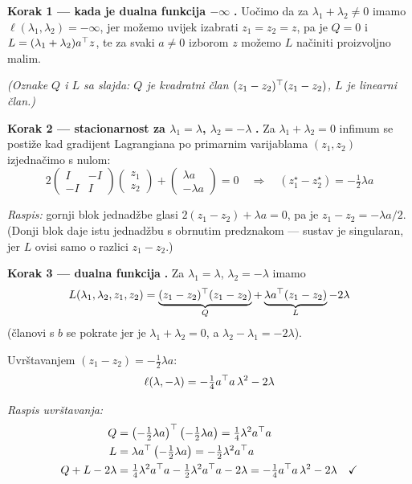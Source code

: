 \textbf{Korak 1 --- kada je dualna funkcija $-\infty$} \textbf{.}
Uočimo da za $\lambda_1 + \lambda_2 \ne 0$ imamo
$\ell(\lambda_1,\lambda_2) = -\infty$, jer možemo uvijek izabrati
$z_1 = z_2 = z$, pa je $Q = 0$ i $L = (\lambda_1+\lambda_2)a^{\top} z$, te za svaki
$a \ne 0$ izborom $z$ možemo $L$ načiniti proizvoljno malim.

\emph{(Oznake $Q$ i $L$ sa slajda: $Q$ je kvadratni član
$(z_1-z_2)^{\top}(z_1-z_2)$, $L$ je linearni član.)}

\textbf{Korak 2 --- stacionarnost za $\lambda_1 = \lambda$,
$\lambda_2 = -\lambda$} \textbf{.} Za $\lambda_1 + \lambda_2 = 0$
infimum se postiže kad gradijent Lagrangiana po primarnim varijablama
$(z_1,z_2)$ izjednačimo s nulom:
\[
2\begin{pmatrix} I & -I \\ -I & I\end{pmatrix}
\begin{pmatrix}z_1\\z_2\end{pmatrix}
+ \begin{pmatrix}\lambda a \\ -\lambda a\end{pmatrix} = 0
\quad\Longrightarrow\quad
(z_1^\star - z_2^\star) = -\tfrac12\lambda a
\]

\emph{Raspis:} gornji blok jednadžbe glasi $2(z_1 - z_2) + \lambda a = 0$, pa je
$z_1 - z_2 = -\lambda a/2$. (Donji blok daje istu jednadžbu s obrnutim
predznakom --- sustav je singularan, jer $L$ ovisi samo o razlici $z_1 - z_2$.)
\checkmark

\textbf{Korak 3 --- dualna funkcija} \textbf{.} Za
$\lambda_1 = \lambda$, $\lambda_2 = -\lambda$ imamo
\[
L(\lambda_1,\lambda_2,z_1,z_2)
= \underbrace{(z_1-z_2)^{\top}(z_1-z_2)}_{Q}
+ \underbrace{\lambda a^{\top}(z_1-z_2)}_{L} - 2\lambda
\]
(članovi s $b$ se pokrate jer je $\lambda_1 + \lambda_2 = 0$, a
$\lambda_2 - \lambda_1 = -2\lambda$).

Uvrštavanjem $(z_1 - z_2) = -\tfrac12\lambda a$:
\[
\ell(\lambda,-\lambda) = -\tfrac14 a^{\top} a\,\lambda^2 - 2\lambda
\]

\emph{Raspis uvrštavanja:}
\begin{align}
Q &= \left(-\tfrac12\lambda a\right)^{\top}\left(-\tfrac12\lambda a\right)
   = \tfrac14\lambda^2 a^{\top} a \\
L &= \lambda a^{\top}\left(-\tfrac12\lambda a\right) = -\tfrac12\lambda^2 a^{\top} a \\
Q + L - 2\lambda
  &= \tfrac14\lambda^2a^{\top} a - \tfrac12\lambda^2a^{\top} a - 2\lambda
   = -\tfrac14 a^{\top} a\,\lambda^2 - 2\lambda \quad\checkmark
\end{align}

